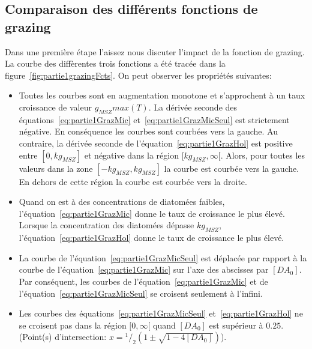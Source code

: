 {\subsection{Comparaison des différents fonctions de grazing}

\par{
Dans une première étape l'aissez nous discuter l'impact de la fonction de grazing. La courbe des
diffèrentes trois fonctions a été tracée dans la figure~\ref{fig:partie1grazingFcts}.
On peut observer les propriétés suivantes:
}
\begin{itemize}
  \item Toutes les courbes sont en augmentation monotone et s'approchent à un taux croissance de valeur
$g_{MSZ} max(T)$. La dérivée seconde des équations~\ref{eq:partie1GrazMic} et~\ref{eq:partie1GrazMicSeul}
est strictement négative. En conséquence les courbes sont courbées vers la gauche. Au contraire, la
dérivée seconde de l'équation~\ref{eq:partie1GrazHol} est positive entre $[0, kg_{MSZ}]$
et négative dans la région $[kg_{MSZ}, \infty[$. Alors, pour toutes les valeurs dans la zone $[-kg_{MSZ},kg_{MSZ}]$
la courbe est courbée vers la gauche. En dehors de cette région la courbe est courbée vers la droite.
  \item Quand on est à des concentrations de diatomées faibles, l'équation~\ref{eq:partie1GrazMic}
donne le taux de croissance le plus élevé. Lorsque la concentration des diatomées dépasse $kg_{MSZ}$,
l'équation~\ref{eq:partie1GrazHol} donne le taux de croissance le plus élevé.
  \item La courbe de l'équation~\ref{eq:partie1GrazMicSeul} est déplacée par rapport à la
courbe de l'équation~\ref{eq:partie1GrazMic} sur l'axe des abscisses par $[DA_0]$. Par conséquent,
les courbes de l'équation~\ref{eq:partie1GrazMic} et de l'équation~\ref{eq:partie1GrazMicSeul}
se croisent seulement à l'infini.
  \item Les courbes des équations~\ref{eq:partie1GrazMicSeul} et~\ref{eq:partie1GrazHol}
ne se croisent pas dans la région $[0, \infty[$ quand $[DA_0]$ est supérieur à $0.25$.
(Point(s) d'intersection: $x = {^1/_2} \left ( 1 \pm \sqrt{1 - 4 [DA_0]}\right )$).
\end{itemize}

}
